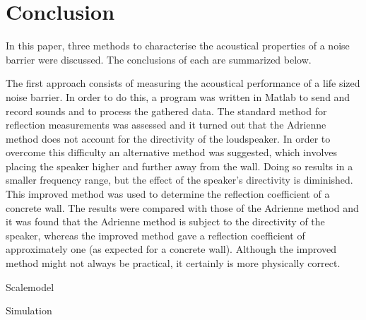 \section{Conclusion}
In this paper, three methods to characterise the acoustical properties of a noise barrier were discussed. The conclusions of each are summarized below.

The first approach consists of measuring the acoustical performance of a life sized noise barrier. In order to do this, a program was written in Matlab to send and record sounds and to process the gathered data. The standard method for reflection measurements was assessed and it turned out that the Adrienne method does not account for the directivity of the loudspeaker. In order to overcome this difficulty an alternative method was suggested, which involves placing the speaker higher and further away from the wall. Doing so results in a smaller frequency range, but the effect of the speaker's directivity is diminished. This improved method was used to determine the reflection coefficient of a concrete wall. The results were compared with those of the Adrienne method and it was found that the Adrienne method is subject to the directivity of the speaker, whereas the improved method gave a reflection coefficient of approximately one (as expected for a concrete wall).  Although the improved method might not always be practical, it certainly is more physically correct.

Scalemodel 

Simulation